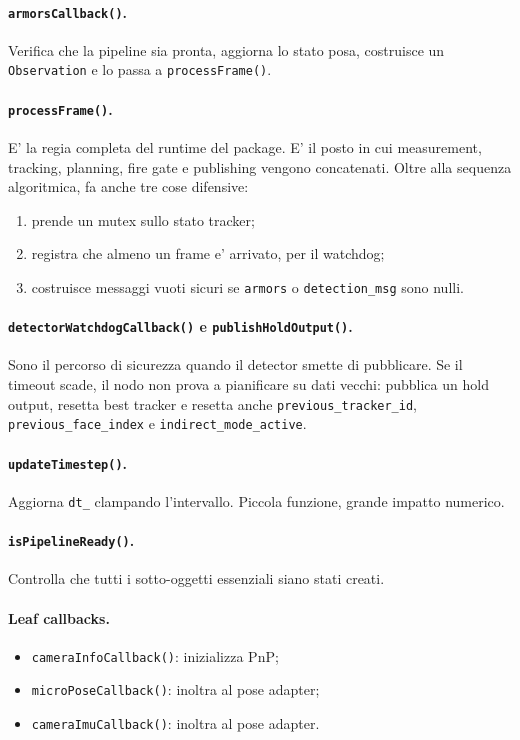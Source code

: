 \documentclass[11pt,a4paper]{article}
\newcommand{\code}[1]{\texttt{#1}}
\begin{document}
\paragraph{\code{armorsCallback()}.}
Verifica che la pipeline sia pronta, aggiorna lo stato posa, costruisce un \code{Observation} e lo passa a \code{processFrame()}.

\paragraph{\code{processFrame()}.}
E' la regia completa del runtime del package. E' il posto in cui measurement, tracking, planning, fire gate e publishing vengono concatenati. Oltre alla sequenza algoritmica, fa anche tre cose difensive:
\begin{enumerate}[leftmargin=1.4em]
  \item prende un mutex sullo stato tracker;
  \item registra che almeno un frame e' arrivato, per il watchdog;
  \item costruisce messaggi vuoti sicuri se \code{armors} o \code{detection\_msg} sono nulli.
\end{enumerate}

\paragraph{\code{detectorWatchdogCallback()} e \code{publishHoldOutput()}.}
Sono il percorso di sicurezza quando il detector smette di pubblicare. Se il timeout scade, il nodo non prova a pianificare su dati vecchi: pubblica un hold output, resetta best tracker e resetta anche \code{previous\_tracker\_id}, \code{previous\_face\_index} e \code{indirect\_mode\_active}.

\paragraph{\code{updateTimestep()}.}
Aggiorna \code{dt\_} clampando l'intervallo. Piccola funzione, grande impatto numerico.

\paragraph{\code{isPipelineReady()}.}
Controlla che tutti i sotto-oggetti essenziali siano stati creati.

\paragraph{Leaf callbacks.}
\begin{itemize}[leftmargin=1.4em]
  \item \code{cameraInfoCallback()}: inizializza PnP;
  \item \code{microPoseCallback()}: inoltra al pose adapter;
  \item \code{cameraImuCallback()}: inoltra al pose adapter.
\end{itemize}
\end{document}
